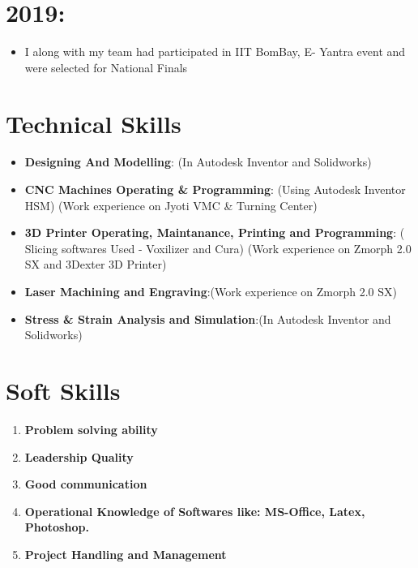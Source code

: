 \documentclass[margin,line]{res}
\begin{document}
\begin{resume}
\hspace{.5in}\section{\LARGE2019:}
\begin{itemize}
\item{\sc I along with my team had participated in IIT BomBay, E- Yantra event and were selected for National Finals} \\	
\end{itemize}

\section{\sc Technical Skills}
\begin{itemize}
\item{\bf Designing And Modelling}: (In Autodesk Inventor and Solidworks)
\item{\bf CNC Machines Operating \& Programming}: (Using Autodesk Inventor HSM) (Work experience on Jyoti VMC \&  Turning Center)
\item{\bf 3D Printer Operating, Maintanance, Printing and Programming}: ( Slicing softwares Used - Voxilizer and Cura) (Work experience on Zmorph 2.0 SX and 3Dexter 3D Printer)
\item{\bf Laser Machining and Engraving}:(Work experience on Zmorph 2.0 SX)
\item{\bf Stress \& Strain Analysis and Simulation}:(In Autodesk Inventor and Solidworks)\\
\end{itemize}
\section{\sc Soft Skills}
\begin{enumerate}
\item{\bf Problem solving ability}
\item{\bf Leadership Quality}
\item{\bf Good communication}
\item{\bf Operational Knowledge of Softwares like: MS-Office, Latex, Photoshop.}
\item{\bf Project Handling and Management}\\
\end{enumerate}


\end{resume}
\end{document}
